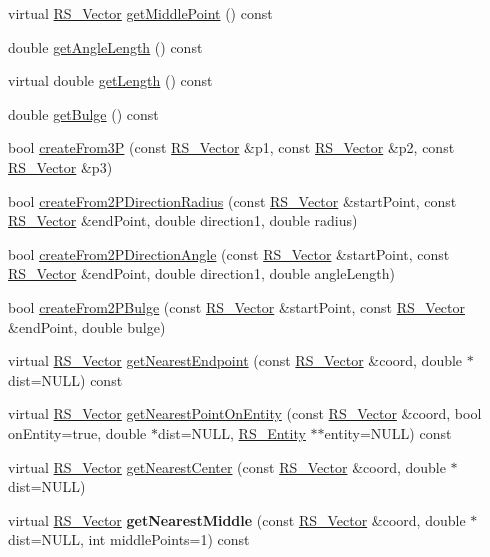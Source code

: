 \begin{DoxyCompactItemize}
\item 
virtual \hyperlink{classRS__Vector}{R\-S\-\_\-\-Vector} \hyperlink{classRS__Arc_aae3990ff444de4a70e23fad501220e2c}{get\-Middle\-Point} () const 
\item 
double \hyperlink{classRS__Arc_a28a7722cff6e51018a109be3e4495dfb}{get\-Angle\-Length} () const 
\item 
virtual double \hyperlink{classRS__Arc_a6f6a5d36a9c342118e7dc1e1dd48a7ca}{get\-Length} () const 
\item 
double \hyperlink{classRS__Arc_af58715b7888e295469db2a58f460d417}{get\-Bulge} () const 
\item 
bool \hyperlink{classRS__Arc_af043feb85f59600c79c91548969b460f}{create\-From3\-P} (const \hyperlink{classRS__Vector}{R\-S\-\_\-\-Vector} \&p1, const \hyperlink{classRS__Vector}{R\-S\-\_\-\-Vector} \&p2, const \hyperlink{classRS__Vector}{R\-S\-\_\-\-Vector} \&p3)
\item 
bool \hyperlink{classRS__Arc_ace178eb36bc032392ef640316e87349b}{create\-From2\-P\-Direction\-Radius} (const \hyperlink{classRS__Vector}{R\-S\-\_\-\-Vector} \&start\-Point, const \hyperlink{classRS__Vector}{R\-S\-\_\-\-Vector} \&end\-Point, double direction1, double radius)
\item 
bool \hyperlink{classRS__Arc_a07303882c8393507773549d3c1b25c36}{create\-From2\-P\-Direction\-Angle} (const \hyperlink{classRS__Vector}{R\-S\-\_\-\-Vector} \&start\-Point, const \hyperlink{classRS__Vector}{R\-S\-\_\-\-Vector} \&end\-Point, double direction1, double angle\-Length)
\item 
bool \hyperlink{classRS__Arc_aa1138b9def16d07eb9c62889e606bbf9}{create\-From2\-P\-Bulge} (const \hyperlink{classRS__Vector}{R\-S\-\_\-\-Vector} \&start\-Point, const \hyperlink{classRS__Vector}{R\-S\-\_\-\-Vector} \&end\-Point, double bulge)
\item 
virtual \hyperlink{classRS__Vector}{R\-S\-\_\-\-Vector} \hyperlink{classRS__Arc_ac832fe69876d3eff3619fbba9de8462d}{get\-Nearest\-Endpoint} (const \hyperlink{classRS__Vector}{R\-S\-\_\-\-Vector} \&coord, double $\ast$dist=N\-U\-L\-L) const 
\item 
virtual \hyperlink{classRS__Vector}{R\-S\-\_\-\-Vector} \hyperlink{classRS__Arc_aad3407a82c3970850a3f8382a72f1407}{get\-Nearest\-Point\-On\-Entity} (const \hyperlink{classRS__Vector}{R\-S\-\_\-\-Vector} \&coord, bool on\-Entity=true, double $\ast$dist=N\-U\-L\-L, \hyperlink{classRS__Entity}{R\-S\-\_\-\-Entity} $\ast$$\ast$entity=N\-U\-L\-L) const 
\item 
virtual \hyperlink{classRS__Vector}{R\-S\-\_\-\-Vector} \hyperlink{classRS__Arc_a1339bfcb014fef3b802dae286e18ab6e}{get\-Nearest\-Center} (const \hyperlink{classRS__Vector}{R\-S\-\_\-\-Vector} \&coord, double $\ast$dist=N\-U\-L\-L)
\item 
\hypertarget{classRS__Arc_abd5c7d21b0ab374ae2cbcb28dc4b9dc8}{virtual \hyperlink{classRS__Vector}{R\-S\-\_\-\-Vector} {\bfseries get\-Nearest\-Middle} (const \hyperlink{classRS__Vector}{R\-S\-\_\-\-Vector} \&coord, double $\ast$dist=N\-U\-L\-L, int middle\-Points=1) const }\label{classRS__Arc_abd5c7d21b0ab374ae2cbcb28dc4b9dc8}


\end{DoxyCompactItemize}
